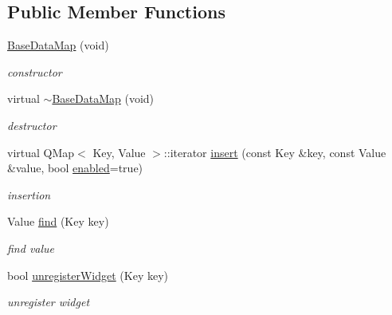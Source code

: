 \subsection*{Public Member Functions}
\begin{DoxyCompactItemize}
\item 
\mbox{\label{class_base_data_map_a9a591533f9d9ce6c059b2a7be9412ed0}} 
\hyperlink{class_base_data_map_a9a591533f9d9ce6c059b2a7be9412ed0}{Base\+Data\+Map} (void)
\begin{DoxyCompactList}\small\item\em constructor \end{DoxyCompactList}\item 
\mbox{\label{class_base_data_map_a74b1986c0c21690453b0377ad3a0df41}} 
virtual \hyperlink{class_base_data_map_a74b1986c0c21690453b0377ad3a0df41}{$\sim$\+Base\+Data\+Map} (void)
\begin{DoxyCompactList}\small\item\em destructor \end{DoxyCompactList}\item 
\mbox{\label{class_base_data_map_a53569bfaf40c452795a9ff066a861fae}} 
virtual Q\+Map$<$ Key, Value $>$\+::iterator \hyperlink{class_base_data_map_a53569bfaf40c452795a9ff066a861fae}{insert} (const Key \&key, const Value \&value, bool \hyperlink{class_base_data_map_aff5bcfb516d51bbbcd3ba30ea535b3ca}{enabled}=true)
\begin{DoxyCompactList}\small\item\em insertion \end{DoxyCompactList}\item 
\mbox{\label{class_base_data_map_aab832c209b3ea4ce030130b0d7330184}} 
Value \hyperlink{class_base_data_map_aab832c209b3ea4ce030130b0d7330184}{find} (Key key)
\begin{DoxyCompactList}\small\item\em find value \end{DoxyCompactList}\item 
\mbox{\label{class_base_data_map_a2b7ac90fa94d2408f1694f3d179525c5}} 
bool \hyperlink{class_base_data_map_a2b7ac90fa94d2408f1694f3d179525c5}{unregister\+Widget} (Key key)
\begin{DoxyCompactList}\small\item\em unregister widget \end{DoxyCompactList}\item 

\end{DoxyCompactItemize}
